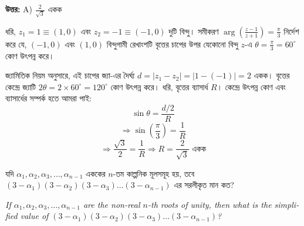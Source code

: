 \documentclass[12pt, a4paper]{article}
\begin{document}
\vspace{0.5em}
\begin{tcolorbox}[answerbox]
    \textbf{\color{success} উত্তর:} A) $\frac{2}{\sqrt{3}}$ একক
\end{tcolorbox}
\vspace{1em}

\begin{tcolorbox}[solutionbox={সমাধান (Solution)}]
    \noindent
    ধরি, $z_1 = 1 \equiv (1, 0)$ এবং $z_2 = -1 \equiv (-1, 0)$ দুটি বিন্দু। সমীকরণ $\arg\left(\frac{z-1}{z+1}\right) = \frac{\pi}{3}$ নির্দেশ করে যে, $(-1, 0)$ এবং $(1, 0)$ বিন্দুগামী রেখাংশটি বৃত্তের চাপের উপর যেকোনো বিন্দু $z$-এ $\theta = \frac{\pi}{3} = 60^\circ$ কোণ উৎপন্ন করে। 
    
    \vspace{0.5em}
    জ্যামিতিক নিয়ম অনুসারে, এই চাপের জ্যা-এর দৈর্ঘ্য $d = |z_1 - z_2| = |1 - (-1)| = 2$ একক। বৃত্তের কেন্দ্রে জ্যাটি $2\theta = 2 \times 60^\circ = 120^\circ$ কোণ উৎপন্ন করে। ধরি, বৃত্তের ব্যাসার্ধ $R$। কেন্দ্রে উৎপন্ন কোণ এবং ব্যাসার্ধের সম্পর্ক হতে আমরা পাই:
    \[ \sin\theta = \frac{d/2}{R} \]
    \[ \Rightarrow \sin\left(\frac{\pi}{3}\right) = \frac{1}{R} \]
    \[ \Rightarrow \frac{\sqrt{3}}{2} = \frac{1}{R} \Rightarrow R = \frac{2}{\sqrt{3}} \text{ একক} \]
\end{tcolorbox}
\vspace{1em}

\begin{tcolorbox}[questionbox={প্রশ্ন (Question) 15}]
    \noindent
    যদি $\alpha_1, \alpha_2, \alpha_3, \dots, \alpha_{n-1}$ এককের $n$-তম কাল্পনিক মূলসমূহ হয়, তবে $(3 - \alpha_1)(3 - \alpha_2)(3 - \alpha_3)\dots(3 - \alpha_{n-1})$ এর সরলীকৃত মান কত?
    
    \vspace{0.8em}
    \begin{english}
    \noindent\textit{\color{darkgray}
    If $\alpha_1, \alpha_2, \alpha_3, \dots, \alpha_{n-1}$ are the non-real $n$-th roots of unity, then what is the simplified value of $(3 - \alpha_1)(3 - \alpha_2)(3 - \alpha_3)\dots(3 - \alpha_{n-1})$?
    }
    \end{english}
\end{tcolorbox}
\end{document}
